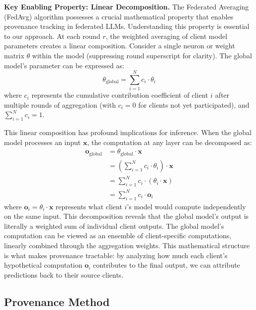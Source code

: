 \textbf{Key Enabling Property: Linear Decomposition.} The Federated Averaging (FedAvg) algorithm possesses a crucial mathematical property that enables provenance tracking in federated LLMs. Understanding this property is essential to our approach. At each round $r$, the weighted averaging of client model parameters creates a linear composition. Consider a single neuron or weight matrix $\theta$ within the model (suppressing round superscript for clarity). The global model's parameter can be expressed as:
\begin{equation}
\label{eq:linear-parameter}
\theta_{\text{global}} = \sum_{i=1}^N c_i \cdot \theta_i
\end{equation}
where $c_i$ represents the cumulative contribution coefficient of client $i$ after multiple rounds of aggregation (with $c_i = 0$ for clients not yet participated), and $\sum_{i=1}^N c_i = 1$.

This linear composition has profound implications for inference. When the global model processes an input $\mathbf{x}$, the computation at any layer can be decomposed as:
\begin{equation}
\label{eq:linear-decomposition}
\begin{split}
\mathbf{o}_{\text{global}} &= \theta_{\text{global}} \cdot \mathbf{x} \\
&= \left(\sum_{i=1}^N c_i \cdot \theta_i\right) \cdot \mathbf{x} \\
&= \sum_{i=1}^N c_i \cdot (\theta_i \cdot \mathbf{x}) \\
&= \sum_{i=1}^N c_i \cdot \mathbf{o}_i
\end{split}
\end{equation}
where $\mathbf{o}_i = \theta_i \cdot \mathbf{x}$ represents what client $i$'s model would compute independently on the same input. This decomposition reveals that the global model's output is literally a weighted sum of individual client outputs. The global model's computation can be viewed as an ensemble of client-specific computations, linearly combined through the aggregation weights. This mathematical structure is what makes provenance tractable: by analyzing how much each client's hypothetical computation $\mathbf{o}_i$ contributes to the final output, we can attribute predictions back to their source clients.

\subsection{Provenance Method}

